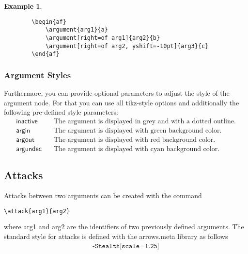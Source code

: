 \documentclass{article}
\newtheorem{example}{Example}
\begin{document}
    \begin{example}~

    \begin{verbatim}
        \begin{af}
            \argument{arg1}{a}
            \argument[right=of arg1]{arg2}{b}
            \argument[right=of arg2, yshift=-10pt]{arg3}{c}
        \end{af}
    \end{verbatim}

    \begin{center}
        \begin{af}
        \end{af}
    \end{center}
        
    \end{example}

    \subsubsection{Argument Styles}
    Furthermore, you can provide optional parameters to adjust the style of the argument node.
    For that you can use all \textsf{tikz}-style options and additionally the following pre-defined style parameters:
    \begin{align*}
        \mathsf{inactive} &\quad \text{The argument is displayed in grey and with a dotted outline.}\\
        \mathsf{argin} &\quad \text{The argument is displayed with green background color.}\\
        \mathsf{argout} &\quad \text{The argument is displayed with red background color.}\\
        \mathsf{argundec} &\quad \text{The argument is displayed with cyan background color.}
    \end{align*}

\subsection{Attacks}
    Attacks between two arguments can be created with the command

    \verb|\attack{arg1}{arg2}|

    \noindent
    where \textsf{arg1} and \textsf{arg2} are the identifiers of two previously defined arguments.
    The \textsf{standard} style for attacks is defined with the \textsf{arrows.meta} library as follows
    \begin{align*}
        \texttt{-{Stealth[scale=1.25]}}
    \end{align*}
\end{document}
